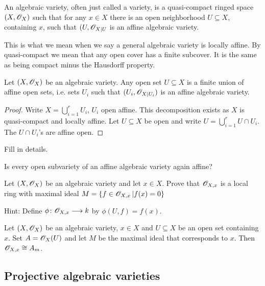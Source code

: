 \begin{definition}
An algebraic variety, often just called a variety, is a quasi-compact ringed space $(X, \mathscr{O}_X)$ such that for any $x\in X$ there is an open neighborhood $U\subseteq X$, containing $x$, such that $(U, \mathscr{O}_{X\vert U}$ is an affine algebraic variety. 

\end{definition}
 
This is what we mean when we say a general algebraic variety is locally affine. By quasi-compact we mean that any open cover has a finite subcover. It is the same as being compact minus the Hausdorff property. 

\begin{proposition}
Let $(X, \mathscr{O}_X)$ be an algebraic variety. Any open set $U\subseteq X$ is a finite union of affine open sets, i.e. sets $U_i$ such that $(U_i, \mathscr{O}_{X\vert U_i})$ is an affine algebraic variety.  
\end{proposition}
\begin{proof}
Write $X=\bigcup_{i=1}^r U_i$, $U_i$ open affine. This decomposition exists as $X$ is quasi-compact and locally affine. Let $U\subseteq X$ be open and write $U=\bigcup_{i=1}^r U\cap U_i$. The $U\cap U_i$'s are affine open.
\end{proof}
\begin{problem}
Fill in details.
\end{problem}

\begin{problem}
Is every open subvariety of an affine algebraic variety again affine? 
\end{problem}

\begin{problem}
Let $(X, \mathscr{O}_X)$ be an algebraic variety and let $x\in X$. Prove that $\mathscr{O}_{X, x}$ is a local ring with maximal ideal $M=\{ f\in \mathscr{O}_{X,x} \,\vert f(x)=0  \}$
\end{problem}
Hint: Define $\phi\colon\mathscr{O}_{X,x}\longrightarrow k$ by $\phi(U, f)=f(x)$. 

\begin{proposition}
Let $(X, \mathscr{O}_X)$ be an algebraic variety, $x\in X$ and $U\subseteq X$ be an open set containing $x$. Set $A=\mathscr{O}_X(U)$ and let $M$ be the maximal ideal that corresponds to $x$. Then $\mathscr{O}_{X,x}\cong A_m$. 
\end{proposition}

\subsection{Projective algebraic varieties}

